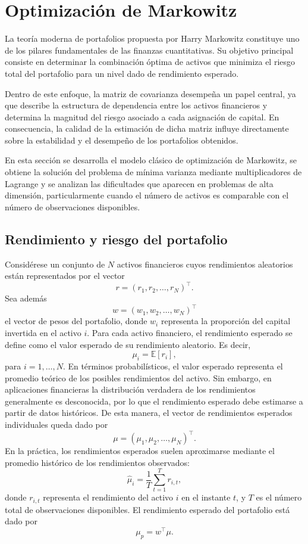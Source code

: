 \documentclass[letterpaper,12pt,oneside]{book}
\begin{document}
\section{Optimización de Markowitz}

La teoría moderna de portafolios propuesta por Harry Markowitz constituye uno de los pilares fundamentales de las finanzas cuantitativas. Su objetivo principal consiste en determinar la combinación óptima de activos que minimiza el riesgo total del portafolio para un nivel dado de rendimiento esperado.

Dentro de este enfoque, la matriz de covarianza desempeña un papel central, ya que describe la estructura de dependencia entre los activos financieros y determina la magnitud del riesgo asociado a cada asignación de capital. En consecuencia, la calidad de la estimación de dicha matriz influye directamente sobre la estabilidad y el desempeño de los portafolios obtenidos.

En esta sección se desarrolla el modelo clásico de optimización de Markowitz, se obtiene la solución del problema de mínima varianza mediante multiplicadores de Lagrange y se analizan las dificultades que aparecen en problemas de alta dimensión, particularmente cuando el número de activos es comparable con el número de observaciones disponibles.

\subsection{Rendimiento y riesgo del portafolio}

Considérese un conjunto de $N$ activos financieros cuyos rendimientos aleatorios están representados por el vector\[r =(r_1,r_2,\dots,r_N)^\top.\]Sea además\[w =(w_1,w_2,\dots,w_N)^\top\]el vector de pesos del portafolio, donde $w_i$ representa la proporción del capital invertida en el activo $i$. Para cada activo financiero, el rendimiento esperado se define como el valor esperado de su rendimiento aleatorio. Es decir,\[\mu_i = \mathbb{E}[r_i],\]para \(i=1,\dots,N\). En términos probabilísticos, el valor esperado representa el promedio teórico de los posibles rendimientos del activo. Sin embargo, en aplicaciones financieras la distribución verdadera de los rendimientos generalmente es desconocida, por lo que el rendimiento esperado debe estimarse a partir de datos históricos. De esta manera, el vector de rendimientos esperados individuales queda dado por\[\mu =(\mu_1,\mu_2,\dots,\mu_N)^\top.\] En la práctica, los rendimientos esperados suelen aproximarse mediante el promedio histórico de los rendimientos observados:\[\widehat{\mu}_i=\frac{1}{T}\sum_{t=1}^T r_{i,t},\]donde \(r_{i,t}\) representa el rendimiento del activo \(i\) en el instante \(t\), y \(T\) es el número total de observaciones disponibles. El rendimiento esperado del portafolio está dado por\[\mu_p = w^\top \mu.\]
\end{document}

